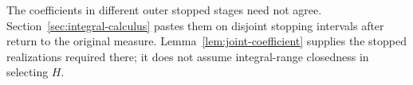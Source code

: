 The coefficients in different outer stopped stages need not agree.
Section~\ref{sec:integral-calculus} pastes them on disjoint stopping intervals after
return to the original measure. Lemma~\ref{lem:joint-coefficient} supplies
the stopped realizations required there; it does not assume integral-range
closedness in selecting $H$.
